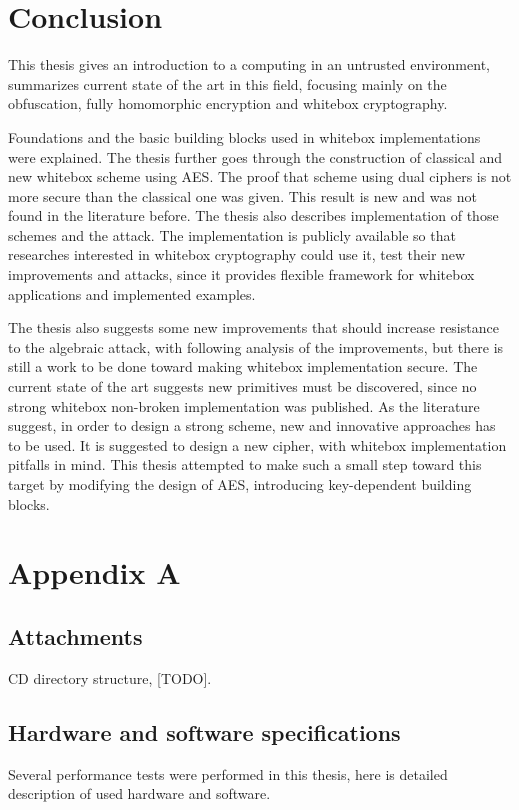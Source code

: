 \documentclass[11pt,oneside,final]{fithesis2}
\begin{document}
\chapter{Conclusion}\label{sec:conclusion}   
    This thesis gives an introduction to a computing in an untrusted environment, summarizes current state of the art in this field, focusing 
    mainly on the obfuscation, fully homomorphic encryption and whitebox cryptography.
    
    Foundations and the basic building blocks used in whitebox implementations were explained. The thesis further goes through 
    the construction of classical and new whitebox scheme using AES. The proof that scheme using dual ciphers is not more secure than the classical one 
    was given. This result is new and was not found in the literature before. The thesis also describes implementation of those schemes and 
    the attack. The implementation is publicly available so that researches interested in whitebox cryptography could use it, test their new improvements and
    attacks, since it provides flexible framework for whitebox applications and implemented examples.
    
    The thesis also suggests some new improvements that should increase resistance to the algebraic attack, with following analysis of the improvements, but
    there is still a work to be done toward making whitebox implementation secure. The current state of the art suggests new primitives must be discovered, since
    no strong whitebox non-broken implementation was published. As the literature \citep{Billet:2004:CWB:2080787.2080809, wyseurPhd} suggest, in order 
    to design a strong scheme, new and innovative approaches has to be used. It is suggested to design a new cipher, with whitebox implementation pitfalls in mind.
    This thesis attempted to make such a small step toward this target by modifying the design of AES, introducing key-dependent building blocks.
    
\appendix

\chapter{Appendix A}
    \section{Attachments}\label{appendix:attach}
    CD directory structure, [TODO].
    
    
    \section{Hardware and software specifications}\label{appendix:hw_spec}
    Several performance tests were performed in this thesis, here is detailed description of used hardware and software.
    
\end{document}
